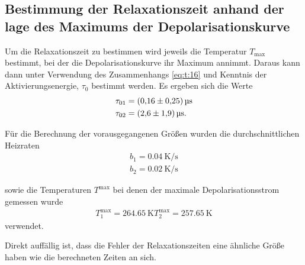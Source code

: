 \subsection{Bestimmung der Relaxationszeit anhand der lage des Maximums der Depolarisationskurve}
\label{subsec:zeit}
Um die Relaxationszeit zu bestimmen wird jeweils die Temperatur $T_\text{max}$ bestimmt, bei der die Depolarisationskurve ihr Maximum annimmt.
Daraus kann dann unter Verwendung des Zusammenhangs \eqref{eq:t:16} und Kenntnis der Aktivierungsenergie, $\tau_{0}$ bestimmt werden.
Es ergeben sich die Werte
\\
\begin{align*}
  \tau_{01} &= \SI{0.16+-0.25}{\micro\second}\\
  \tau_{02} &= \SI{2.6+-1.9}{\micro\second}.
\end{align*}

Für die Berechnung der vorausgegangenen Größen wurden die durchschnittlichen
Heizraten
\\
\begin{align*}
  b_{1} = \SI{0.04}{\kelvin\per\second}\\
  b_{2} = \SI{0.02}{\kelvin\per\second}
\end{align*}

sowie die Temperaturen $T^\text{max}$ bei denen der maximale Depolarisationsstrom gemessen wurde
\\
\begin{align*}
  T^\text{max}_{1} = \SI{264.65}{\kelvin}
  T^\text{max}_{2} = \SI{257.65}{\kelvin}
\end{align*}
verwendet.

Direkt auffällig ist, dass die Fehler der Relaxationszeiten eine ähnliche
Größe haben wie die berechneten Zeiten an sich.
